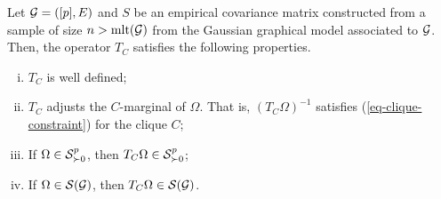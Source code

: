 \begin{proposition}
    Let $\G = ([p], E)$ and $S$ be an empirical covariance matrix constructed from a sample of size $n > \t{mlt}(\G)$ from the Gaussian graphical model associated to $\G$. Then, the operator $T_C$ satisfies the following properties.
    \begin{enumerate}[i.]
        \item $T_C$ is well defined;
        \item $T_C$ adjusts the $C$-marginal of $\Omega$. That is, $(T_C \Omega)^{-1}$ satisfies (\ref{eq-clique-constraint}) for the clique $C$;
        \item If $\Omega \in \S^p_{\succ 0}$, then $T_C \Omega \in \S^p_{\succ 0}$;
        \item If $\Omega \in \S(\G)$, then $T_C \Omega \in \S(\G)$.
    \end{enumerate}    
\end{proposition}
